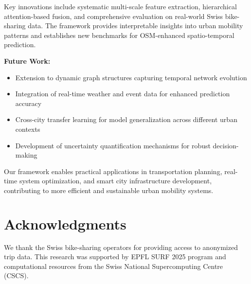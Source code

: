 \documentclass[twocolumn,11pt]{IEEEtran}
\begin{document}
Key innovations include systematic multi-scale feature extraction, hierarchical attention-based fusion, and comprehensive evaluation on real-world Swiss bike-sharing data. The framework provides interpretable insights into urban mobility patterns and establishes new benchmarks for OSM-enhanced spatio-temporal prediction.

\textbf{Future Work:}
\begin{itemize}
\item Extension to dynamic graph structures capturing temporal network evolution
\item Integration of real-time weather and event data for enhanced prediction accuracy
\item Cross-city transfer learning for model generalization across different urban contexts
\item Development of uncertainty quantification mechanisms for robust decision-making
\end{itemize}

Our framework enables practical applications in transportation planning, real-time system optimization, and smart city infrastructure development, contributing to more efficient and sustainable urban mobility systems.

\section*{Acknowledgments}

We thank the Swiss bike-sharing operators for providing access to anonymized trip data. This research was supported by EPFL SURF 2025 program and computational resources from the Swiss National Supercomputing Centre (CSCS).
\end{document}
